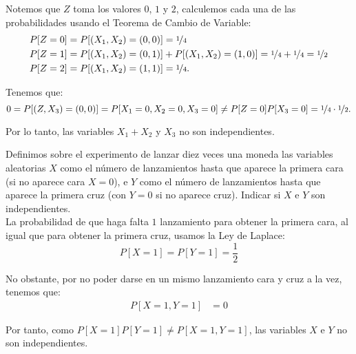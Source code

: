 \begin{ejercicio}
\begin{enumerate}
        Notemos que $Z$ toma los valores $0$, $1$ y $2$, calculemos cada una de las probabilidades usando el Teorema de Cambio de Variable:
        \begin{align*}
            P[Z=0] &= P[(X_1, X_2) = (0,0)] = \nicefrac{1}{4} \\
            P[Z=1] &= P[(X_1, X_2) = (0,1)] + P[(X_1, X_2) = (1,0)] = \nicefrac{1}{4} + \nicefrac{1}{4} = \nicefrac{1}{2} \\
            P[Z=2] &= P[(X_1, X_2) = (1,1)] = \nicefrac{1}{4}.
        \end{align*}

        Tenemos que:
        \begin{equation*}
            0 = P[(Z, X_3) = (0,0)] = P[X_1=0, X_2=0, X_3=0] \neq P[Z=0]P[X_3=0] = \nicefrac{1}{4}\cdot \nicefrac{1}{2}.
        \end{equation*}

        Por lo tanto, las variables $X_1 + X_2$ y $X_3$ no son independientes.
    \end{enumerate}
\end{ejercicio}

\begin{ejercicio}
    Definimos sobre el experimento de lanzar diez veces una moneda las variables aleatorias $X$ como el número de lanzamientos hasta que aparece la primera cara (si no aparece cara $X = 0$), e $Y$ como el número de lanzamientos hasta que aparece la primera cruz (con $Y = 0$ si no aparece cruz). Indicar si $X$ e $Y$ son independientes.\\

    La probabilidad de que haga falta $1$ lanzamiento para obtener la primera cara, al igual que para obtener la primera cruz, usamos la Ley de Laplace:
    \begin{equation*}
        P[X=1] = P[Y=1] = \frac{1}{2}
    \end{equation*}

    No obstante, por no poder darse en un mismo lanzamiento cara y cruz a la vez, tenemos que:
    \begin{align*}
        P[X=1, Y=1] &= 0
    \end{align*}

    Por tanto, como $P[X=1]P[Y=1] \neq P[X=1, Y=1]$, las variables $X$ e $Y$ no son independientes.
\end{ejercicio}

